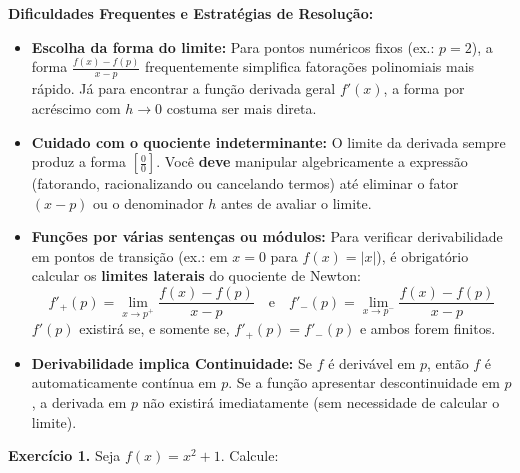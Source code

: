 \begin{dicasbox}
\textbf{Dificuldades Frequentes e Estratégias de Resolução:}
\begin{itemize}[noitemsep, topsep=2pt]
    \item \textbf{Escolha da forma do limite:} Para pontos numéricos fixos (ex.: $p = 2$), a forma $\frac{f(x) - f(p)}{x - p}$ frequentemente simplifica fatorações polinomiais mais rápido. Já para encontrar a função derivada geral $f'(x)$, a forma por acréscimo com $h \to 0$ costuma ser mais direta.
    \item \textbf{Cuidado com o quociente indeterminante:} O limite da derivada sempre produz a forma $\left[\frac{0}{0}\right]$. Você \textbf{deve} manipular algebricamente a expressão (fatorando, racionalizando ou cancelando termos) até eliminar o fator $(x - p)$ ou o denominador $h$ antes de avaliar o limite.
    \item \textbf{Funções por várias sentenças ou módulos:} Para verificar derivabilidade em pontos de transição (ex.: em $x = 0$ para $f(x) = |x|$), é obrigatório calcular os \textbf{limites laterais} do quociente de Newton:
    \[
    f'_+(p) = \lim_{x \to p^+} \frac{f(x) - f(p)}{x - p} \quad \text{e} \quad f'_-(p) = \lim_{x \to p^-} \frac{f(x) - f(p)}{x - p}
    \]
    $f'(p)$ existirá se, e somente se, $f'_+(p) = f'_-(p)$ e ambos forem finitos.
    \item \textbf{Derivabilidade implica Continuidade:} Se $f$ é derivável em $p$, então $f$ é automaticamente contínua em $p$. Se a função apresentar descontinuidade em $p$, a derivada em $p$ não existirá imediatamente (sem necessidade de calcular o limite).
\end{itemize}
\end{dicasbox}

\vspace{0.6cm}
\noindent\textbf{Exercício 1.} Seja $f(x) = x^2 + 1$. Calcule:

